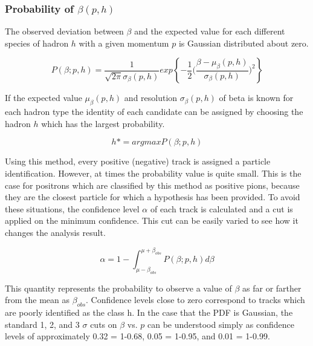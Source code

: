 
\subsubsection{Probability of $\beta(p,h)$}
The observed deviation between $\beta$ and the expected value for each different species of hadron $h$ with a given momentum $p$ is Gaussian distributed about zero.  

\begin{equation}
  P(\beta;p,h) = \frac{1}{\sqrt{2 \pi} \sigma_\beta(p,h) } exp \left \{ -\frac{1}{2} \bigg( \frac{\beta - \mu_\beta(p,h)}{\sigma_\beta(p,h)} \bigg)^2 \right \}
\end{equation}

If the expected value $\mu_\beta(p,h)$  and resolution $\sigma_\beta(p,h)$ of beta is known for each hadron type the identity of each candidate can be assigned by choosing the hadron $h$ which has the largest probability.  
 
\begin{equation}
	h* = argmax P(\beta;p,h)
\end{equation}

Using this method, every positive (negative) track is assigned a particle identification.  However, at times the probability value is quite small.  This is the case for positrons which are classified by this method as positive pions, because they are the closest particle for which a hypothesis has been provided.  To avoid these situations, the confidence level $\alpha$ of each track is calculated and a cut is applied on the minimum confidence.  This cut can be easily varied to see how it changes the analysis result.

\begin{equation}
  \alpha = 1 - \int_{\mu-\beta_{obs}}^{\mu+\beta_{obs}} P(\beta;p,h) d\beta
\end{equation}

This quantity represents the probability to observe a value of $\beta$ as far or farther from the mean as $\beta_{obs}$.  Confidence levels close to zero correspond to tracks which are poorly identified as the class h.  In the case that the PDF is Gaussian, the standard 1, 2, and 3 $\sigma$ cuts on $\beta$ vs. $p$ can be understood simply as confidence levels of approximately 0.32 = 1-0.68, 0.05 = 1-0.95, and 0.01 = 1-0.99.

